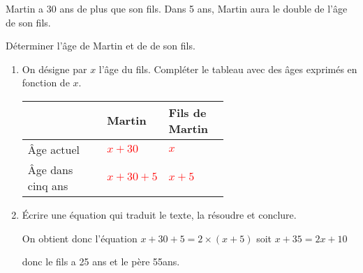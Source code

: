 \begin{corrige}
    Martin a 30 ans de plus que son fils. Dans 5 ans, Martin aura le double de l'âge de son fils.

    Déterminer l'âge de Martin et de de son fils.
    \begin{enumerate}
        \item On désigne par $x$ l'âge du fils. Compléter le tableau avec des âges exprimés en fonction de $x$.
        
        \smallskip
        {\renewcommand{\arraystretch}{1.2}
        \hspace*{-10mm}
        \begin{tabular}{|l|*{2}{>{\centering\arraybackslash}m{0.3\linewidth}|}}
            \cline{2-3}
            \multicolumn{1}{l|}{}&\cellcolor{LightGray}Martin&\cellcolor{LightGray}Fils de Martin\\\hline
            \cellcolor{LightGray}Âge actuel         & \textcolor{red}{$x+30$}   & \textcolor{red}{$x$} \\\hline
            \cellcolor{LightGray}Âge dans cinq ans  & \textcolor{red}{$x+30+5$} & \textcolor{red}{$x+5$} \\\hline
        \end{tabular}
        }
        \smallskip
        \item Écrire une équation qui traduit le texte, la résoudre et conclure.        
        {\color{red} On obtient donc l'équation $x+30+5=2\times(x+5)$ soit $x+35=2x+10$
        

        \vspace*{-10mm}
        donc le fils a 25 ans et le père 55ans.
        }
    \end{enumerate}
    \vspace*{-10mm}
\end{corrige}

